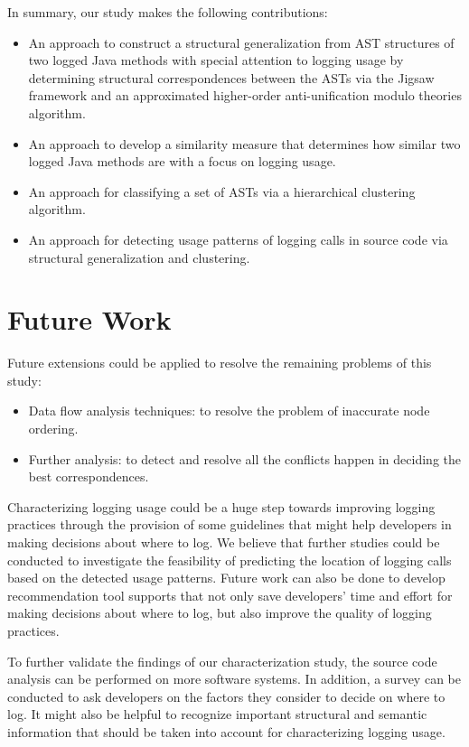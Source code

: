 In summary, our study makes the following contributions:
\begin{itemize} [leftmargin=.4in]
\item An approach to construct a structural generalization from AST structures of two logged Java methods with special attention to logging usage by determining structural correspondences between the ASTs via the Jigsaw framework and an approximated higher-order anti-unification modulo theories algorithm. 
\item An approach to develop a similarity measure that determines how similar two logged Java methods are with a focus on logging usage. 
\item An approach for classifying a set of ASTs via a hierarchical clustering algorithm. 
\item An approach for detecting usage patterns of logging calls in source code via structural generalization and clustering.
\end{itemize}


\section{Future Work}  \label{fw}
Future extensions could be applied to resolve the remaining problems of this study:
\begin{itemize} [leftmargin=.4in]
\item Data flow analysis techniques: to resolve the problem of inaccurate node ordering. 
\item Further analysis: to detect and resolve all the conflicts happen in deciding the best correspondences. 
\end{itemize}

Characterizing logging usage could be a huge step towards improving logging practices through the provision of some guidelines that might help developers in making decisions about where to log. We believe that further studies could be conducted to investigate the feasibility of predicting the location of logging calls based on the detected usage patterns. Future work can also be done to develop recommendation tool supports that not only save developers’ time and effort for making decisions about where to log, but also improve the quality of logging practices. 

To further validate the findings of our characterization study, the source code analysis can be performed on more software systems. In addition, a survey can be conducted to ask developers on the factors they consider to decide on where to log. It might also be helpful to recognize important structural and semantic information that should be taken into account for characterizing logging usage.



